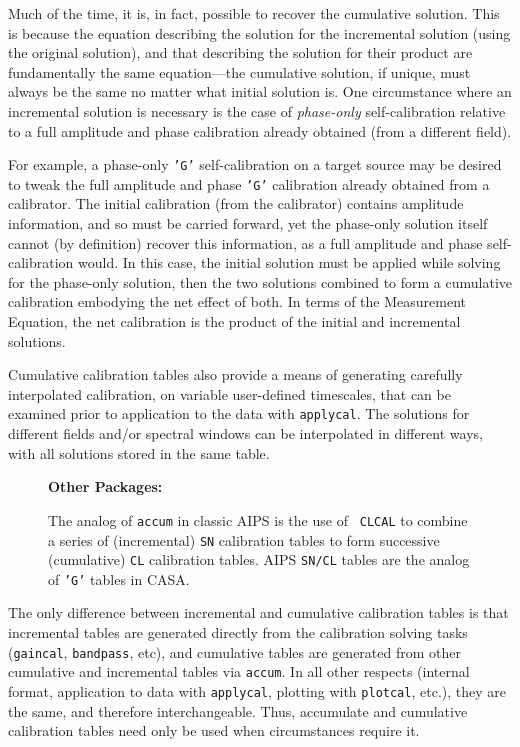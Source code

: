 {Much of the time, it is, in fact, possible to recover the cumulative
solution. This is because the equation describing the solution for the
incremental solution (using the original solution), and that describing
the solution for their product are fundamentally the same equation---the
cumulative solution, if unique, must always be the same no matter what
initial solution is.  One circumstance where an incremental solution is
necessary is the case of {\it phase-only} self-calibration relative to a
full amplitude and phase calibration already obtained (from a different
field).

For example, a phase-only {\tt 'G'} self-calibration on a target source may be
desired to tweak the full amplitude and phase {\tt 'G'} calibration already
obtained from a calibrator. The initial calibration (from the calibrator)
contains amplitude information, and so must be carried forward, yet the
phase-only solution itself cannot (by definition) recover this
information, as a full amplitude and phase self-calibration would. In this
case, the initial solution must be applied while solving for the
phase-only solution, then the two solutions combined to form a cumulative
calibration embodying the net effect of both. In terms of the Measurement
Equation, the net calibration is the product of the initial and
incremental solutions.

Cumulative calibration tables also provide a means of generating
carefully interpolated calibration, on variable user-defined
timescales, that can be examined prior to application to the data with
{\tt applycal}. The solutions for different fields and/or spectral
windows can be interpolated in different ways, with all solutions
stored in the same table.

\begin{wrapfigure}{r}{2.5in}
  \begin{boxedminipage}{2.5in}
     \centerline{\bf Other Packages:}
     The analog of {\tt accum} in classic AIPS is the use of {\tt
     CLCAL} to combine a series of (incremental) {\tt SN} calibration
     tables to form successive (cumulative) {\tt CL} calibration
     tables. AIPS {\tt SN/CL} tables are the analog of {\tt 'G'} 
     tables in CASA.
  \end{boxedminipage}
\end{wrapfigure}

The only difference between incremental and cumulative calibration
tables is that incremental tables are generated directly from the
calibration solving tasks ({\tt gaincal}, {\tt bandpass}, etc), and
cumulative tables are generated from other cumulative and incremental
tables via {\tt accum}. In all other respects (internal format,
application to data with {\tt applycal}, plotting with {\tt plotcal},
etc.), they are the same, and therefore interchangeable. Thus,
accumulate and cumulative calibration tables need only be used when
circumstances require it.

}
